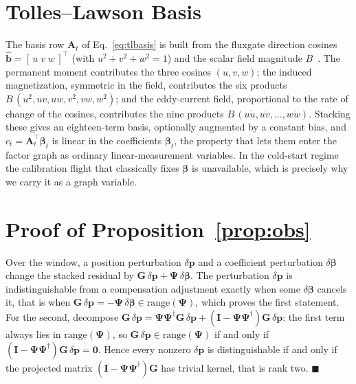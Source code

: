 \documentclass{IEEEtaes}
\begin{document}
\section{Tolles--Lawson Basis}\label{app:tl}
The basis row $\mathbf{A}_t$ of Eq.~\eqref{eq:tlbasis} is built from the fluxgate
direction cosines $\hat{\mathbf{b}}=[\,u\;v\;w\,]^{\top}$ (with $u^2+v^2+w^2=1$) and
the scalar field magnitude $B$~\cite{tolles1950,leliak1961}. The permanent moment
contributes the three cosines $(u,v,w)$; the induced magnetization, symmetric in the
field, contributes the six products
$B\,(u^2,uv,uw,v^2,vw,w^2)$; and the eddy-current field, proportional to the rate of
change of the cosines, contributes the nine products $B\,(u\dot u,u\dot v,\dots,
w\dot w)$. Stacking these gives an eighteen-term basis, optionally augmented by a
constant bias, and $c_t=\mathbf{A}_t^{\top}\boldsymbol{\beta}_t$ is linear in the
coefficients $\boldsymbol{\beta}_t$, the property that lets them enter the factor
graph as ordinary linear-measurement variables. In the cold-start regime the
calibration flight that classically fixes $\boldsymbol{\beta}$ is unavailable, which
is precisely why we carry it as a graph variable.

\section{Proof of Proposition~\ref{prop:obs}}\label{app:proof}
Over the window, a position perturbation $\delta\mathbf{p}$ and a coefficient
perturbation $\delta\boldsymbol{\beta}$ change the stacked residual by
$\mathbf{G}\,\delta\mathbf{p}+\boldsymbol{\Psi}\,\delta\boldsymbol{\beta}$.
The perturbation $\delta\mathbf{p}$ is indistinguishable from a compensation
adjustment exactly when some $\delta\boldsymbol{\beta}$ cancels it, that is
when $\mathbf{G}\,\delta\mathbf{p}=-\boldsymbol{\Psi}\,\delta\boldsymbol{\beta}
\in\mathrm{range}(\boldsymbol{\Psi})$, which proves the first statement.
For the second, decompose
$\mathbf{G}\,\delta\mathbf{p}=\boldsymbol{\Psi}\boldsymbol{\Psi}^{\dagger}
\mathbf{G}\,\delta\mathbf{p}+(\mathbf{I}-\boldsymbol{\Psi}\boldsymbol{\Psi}^{\dagger})
\mathbf{G}\,\delta\mathbf{p}$: the first term always lies in
$\mathrm{range}(\boldsymbol{\Psi})$, so
$\mathbf{G}\,\delta\mathbf{p}\in\mathrm{range}(\boldsymbol{\Psi})$ if and only
if $(\mathbf{I}-\boldsymbol{\Psi}\boldsymbol{\Psi}^{\dagger})\mathbf{G}\,
\delta\mathbf{p}=\mathbf{0}$. Hence every nonzero $\delta\mathbf{p}$ is
distinguishable if and only if the projected matrix
$(\mathbf{I}-\boldsymbol{\Psi}\boldsymbol{\Psi}^{\dagger})\mathbf{G}$ has
trivial kernel, that is rank two. \hfill$\blacksquare$
\end{document}
